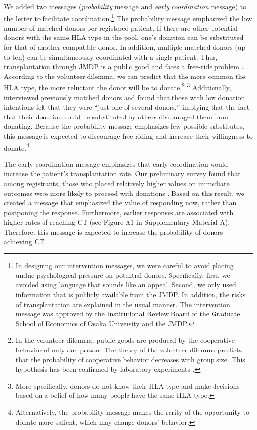 \documentclass[12pt, a4paper]{article}
\begin{document}
We added two messages (\emph{probability} message and \emph{early coordination} message) to the letter to facilitate coordination.\footnote{In designing our intervention messages, we were careful to avoid placing undue psychological pressure on potential donors. Specifically, first, we avoided using language that sounds like an appeal. Second, we only used information that is publicly available from the JMDP. In addition, the risks of transplantation are explained in the usual manner. The intervention message was approved by the Institutional Review Board of the Graduate School of Economics of Osaka University and the JMDP.} The probability message emphasized the low number of matched donors per registered patient. If there are other potential donors with the same HLA type in the pool, one's donation can be substituted for that of another compatible donor. In addition, multiple matched donors (up to ten) can be simultaneously coordinated with a single patient. Thus, transplantation through JMDP is a public good and faces a free-ride problem \citep{Bergstrom2009}. According to the volunteer dilemma, we can predict that the more common the HLA type, the more reluctant the donor will be to donate.\footnote{In the volunteer dilemma, public goods are produced by the cooperative behavior of only one person. The theory of the volunteer dilemma predicts that the probability of cooperative behavior decreases with group size. This hypothesis has been confirmed by laboratory experiments \citep{Diekmann1985, Diekmann1986, Goeree2017}.} \footnote{More specifically, donors do not know their HLA type and make decisions based on a belief of how many people have the same HLA type.} Additionally, \citet{Kurosawa2022} interviewed previously matched donors and found that those with low donation intentions felt that they were ``just one of several donors,'' implying that the fact that their donation could be substituted by others discouraged them from donating. Because the probability message emphasizes few possible substitutes, this message is expected to discourage free-riding and increase their willingness to donate.\footnote{Alternatively, the probability message makes the rarity of the opportunity to donate more salient, which may change donors' behavior.}

The early coordination message emphasizes that early coordination would increase the patient's transplantation rate. Our preliminary survey found that among registrants, those who placed relatively higher values on immediate outcomes were more likely to proceed with donations \citep{Ohtake2020}. Based on this result, we created a message that emphasized the value of responding now, rather than postponing the response. Furthermore, earlier responses are associated with higher rates of reaching CT (see Figure A1 in Supplementary Material A). Therefore, this message is expected to increase the probability of donors achieving CT.
\end{document}
